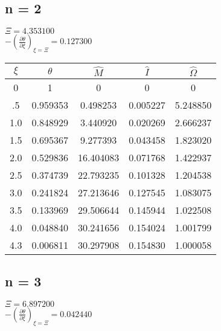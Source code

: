 \documentclass[11pt]{article} %
\newcommand{\pder}[2][]{\frac{\partial#1}{\partial#2}}
\begin{document}
\subsection*{n = 2}

$\Xi = 4.353100$ \\
$-\left(\pder[\theta]{\xi}\right)_{\xi = \Xi} =0.127300$\\

\begin{tabular}{| c | c c c c |}
\hline
$\xi$ & $\theta$ & $\hat{M}$ &  $\hat{I}$  & $\hat{\Omega}$ \\
\hline
0 & 1 & 0 & 0 & 0 \\
.5 & 0.959353 & 0.498253 & 0.005227 & 5.248850\\
1.0 & 0.848929 & 3.440920 &0.020269 & 2.666237\\
1.5 & 0.695367 & 9.277393 & 0.043458 & 1.823020\\
2.0 &0.529836 &16.404083 &0.071768 & 1.422937\\
2.5 & 0.374739 & 22.793235 &0.101328 & 1.204538\\
3.0 & 0.241824 &27.213646 & 0.127545 & 1.083075\\
3.5 & 0.133969 &29.506644 & 0.145944 & 1.022508\\
4.0 & 0.048840 &30.241656 &0.154024 & 1.001799\\
4.3 & 0.006811 &30.297908 &0.154830 & 1.000058\\
\hline
\end{tabular}

\subsection*{n = 3}

$\Xi = 6.897200$ \\
$-\left(\pder[\theta]{\xi}\right)_{\xi = \Xi} =0.042440$\\
\end{document}
